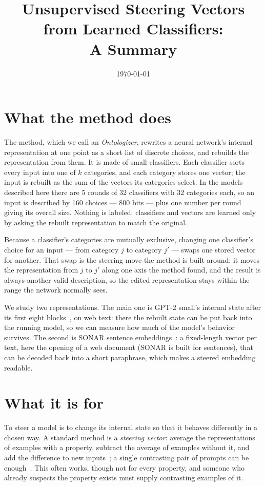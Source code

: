 \documentclass[11pt]{article}
\title{Unsupervised Steering Vectors from Learned Classifiers:\\
A Summary}
\date{\today}
\begin{document}
\maketitle

\section*{What the method does}

The method, which we call an \emph{Ontologizer}, rewrites a neural
network's internal representation at one point as a short list of
discrete choices, and rebuilds the representation from them. It is made of
small classifiers. Each classifier sorts every input into one of $k$
categories, and each category stores one vector; the input is rebuilt as
the sum of the vectors its categories select. In the models described here
there are 5 rounds of 32 classifiers with 32 categories each, so an input
is described by 160 choices --- 800 bits --- plus one number per round
giving its overall size. Nothing is labeled: classifiers and vectors are
learned only by asking the rebuilt representation to match the original.

Because a classifier's categories are mutually exclusive, changing one
classifier's choice for an input --- from category $j$ to category $j'$ ---
swaps one stored vector for another. That swap is the steering move the
method is built around: it moves the representation from $j$ to $j'$ along
one axis the method found, and the result is always another valid
description, so the edited representation stays within the range the
network normally sees.

We study two representations. The main one is GPT-2 small's internal
state after its first eight blocks~\cite{radford2019}, on web text: there the
rebuilt state can be put back into the running model, so we can measure
how much of the model's behavior survives. The second is SONAR sentence
embeddings~\cite{sonar}: a fixed-length vector per text, here the opening
of a web document (SONAR is built for sentences), that can be decoded
back into a short paraphrase, which makes a steered embedding readable.

\section*{What it is for}

To steer a model is to change its internal state so that it behaves
differently in a chosen way. A standard method is a
\emph{steering vector}: average the representations of examples with a
property, subtract the average of examples without it, and add the
difference to new inputs~\cite{rimsky2024}; a single contrasting pair of
prompts can be enough~\cite{turner2024}. This often works, though not for
every property, and someone who already suspects the property exists
must supply contrasting examples of it.
\end{document}

